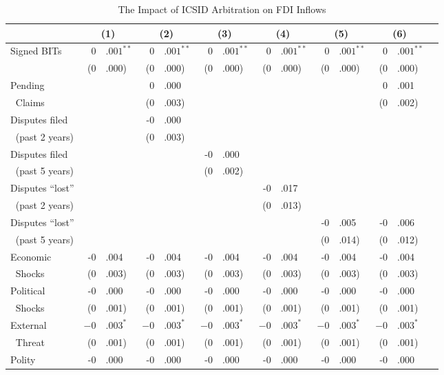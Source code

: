 \documentclass[12pt,onesided]{amsart}
\begin{document}
\begin{table}[ht]
\vspace{1cm}
\centering
{\footnotesize
\caption{The Impact of ICSID Arbitration on FDI Inflows}
\label{tab:allee}
\begin{tabular}{lr@{} lr@{}lr@{}lr@{}lr@{}lr@{}lr@{} }
	\hline\hline
	~ & \multicolumn{2}{c}{(1)} & \multicolumn{2}{c}{(2)} & \multicolumn{2}{c}{(3)} & \multicolumn{2}{c}{(4)} & \multicolumn{2}{c}{(5)} & \multicolumn{2}{c}{(6)} \\ \hline
	\multirow{2}{*}{Signed BITs} & $0$&$.001^{\ast\ast}$ & $0$&$.001^{\ast\ast}$ & $0$&$.001^{\ast\ast}$ & $0$&$.001^{\ast\ast}$ & $0$&$.001^{\ast\ast}$ & $0$&$.001^{\ast\ast}$ \\
	~ & (0&.000) & (0&.000) & (0&.000) & (0&.000) & (0&.000) & (0&.000) \\
	Pending && &0&.000 && && && &0&.001 \\
	$\;\;$Claims && &(0&.003) && && && &(0&.002) \\
	Disputes filed && &-0&.000 && && && && \\
	$\;\;$(past 2 years) && &(0&.003) && && && && \\
	Disputes filed && && &-0&.000 && &&  && \\
	$\;\;$(past 5 years) && && &(0&.002) && && && \\
	Disputes ``lost'' && && && &-0&.017 && && \\
	$\;\;$(past 2 years) && && && &(0&.013) && && \\
	Disputes ``lost'' && && && && &-0&.005 &-0&.006 \\
	$\;\;$(past 5 years) && && && && &(0&.014) &(0&.012) \\
	Economic & -0&.004 & -0&.004 & -0&.004 & -0&.004 & -0&.004 & -0&.004 \\
	$\;\;$Shocks & (0&.003) & (0&.003) & (0&.003) & (0&.003) & (0&.003) & (0&.003) \\
	Political & -0&.000 & -0&.000 & -0&.000 & -0&.000 & -0&.000 & -0&.000 \\
	$\;\;$Shocks & (0&.001) & (0&.001) & (0&.001) & (0&.001) & (0&.001) &(0&.001) \\
	External & $-0$&$.003^{\ast}$ & $-0$&$.003^{\ast}$ & $-0$&$.003^{\ast}$ & $-0$&$.003^{\ast}$ & $-0$&$.003^{\ast}$ & $-0$&$.003^{\ast}$ \\
	$\;\;$Threat & (0&.001) & (0&.001) & (0&.001) & (0&.001) & (0&.001) & (0&.001) \\
	\multirow{2}{*}{Polity} & -0&.000 & -0&.000 & -0&.000 & -0&.000 & -0&.000 & -0&.000 \\

\end{tabular}}
\end{table}
\end{document}
